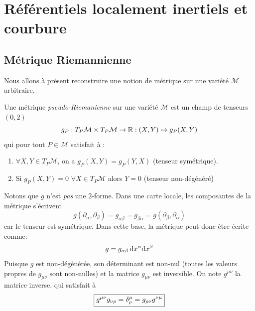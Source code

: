 \chapter{Référentiels localement inertiels et courbure}
\section{Métrique Riemannienne}
Nous allons à présent reconstruire une notion de métrique sur une variété $\mathcal{M}$ arbitraire. 

\begin{theoremframe}
    \begin{defi}
        Une métrique \textit{pseudo-Riemanienne} sur une variété $\mathcal{M}$ est un champ de tenseurs $(0, 2)$
        \begin{equation}
            g_P:T_P\mathcal{M} \times T_P\mathcal{M} \to \mathbb{R}: (X,Y) \mapsto g_P(X,Y)
        \end{equation}
        qui pour tout $P \in \mathcal{M}$ satisfait à :
        \begin{enumerate}
            \item $\forall X, Y \in T_P \mathcal{M}$, on a $g_P(X, Y) = g_P(Y, X)$ (tenseur symétrique).
            \item Si $g_P(X, Y) = 0$ $\forall X \in T_P \mathcal{M}$ alors $Y = 0$ (tenseur non-dégénéré)
        \end{enumerate}
    \end{defi}
\end{theoremframe}
Notons que $g$ n'est \emph{pas} une $2$-forme. Dans une carte locale, les composantes de la métrique s'écrivent
\begin{equation}
g(\partial_{\alpha}, \partial_{\beta}) = g_{\alpha \beta} = g_{\beta \alpha} = g(\partial_{\beta}, \partial_{\alpha})
\end{equation}
car le tenseur est symétrique. Dans cette base, la métrique peut donc être écrite comme:
 \begin{equation}
     g = g_{\alpha \beta}\, \mathrm{d} x^{\alpha}\mathrm{d} x^{\beta}
 \end{equation}
 Puisque $g$ est non-dégénérée, son déterminant est non-nul (toutes les valeurs propres de $g_{\mu \nu}$ sont non-nulles) et la matrice $g_{\mu \nu}$ est inversible. On note $g^{\mu \nu}$ la matrice inverse, qui satisfait à
 \begin{equation}
     \boxed{g^{\mu \nu}g_{\nu \rho} = \delta\indices*{^{\mu}
     _{\rho}} = g_{\rho \nu}g^{\nu \mu}}
 \end{equation}

